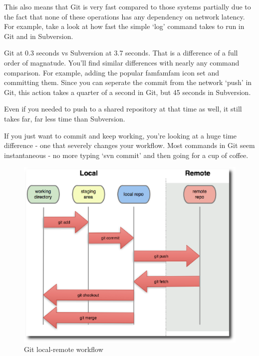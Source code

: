This also means that Git is very fast compared to those systems partially due to
the fact that none of these operations has any dependency on network latency. For
example, take a look at how fast the simple ‘log’ command takes to run in Git and
in Subversion.

Git at 0.3 seconds vs Subversion at 3.7 seconds. That is a difference of a full
order of magnatude. You’ll find similar differences with nearly any command
comparison. For example, adding the popular famfamfam icon set and committing
them. Since you can seperate the commit from the network ‘push’ in Git, this
action takes a quarter of a second in Git, but 45 seconds in Subversion.

Even if you needed to push to a shared repository at that time as well, it still
takes far, far less time than Subversion.

If you just want to commit and keep working, you’re looking at a huge time
difference - one that severely changes your workflow. Most commands in Git seem
instantaneous - no more typing ‘svn commit’ and then going for a cup of coffee.

\begin{figure}
  \begin{center}
    \includegraphics[scale=0.7]{Figures/Git_local.eps}
  \end{center}
  \caption{Git local-remote workflow}
  \label{Git local-remote workflow}
\end{figure}


